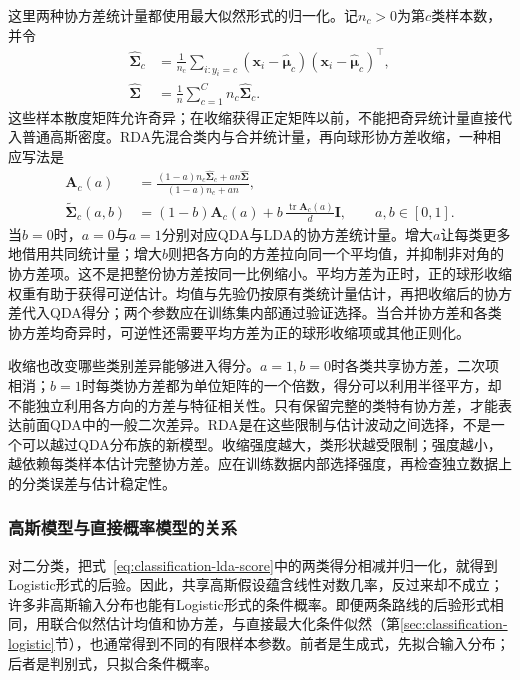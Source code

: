 这里两种协方差统计量都使用最大似然形式的归一化。记$n_c>0$为第$c$类样本数，并令
\[
  \begin{aligned}
    \hat{\bm{\Sigma}}_c
      &=\frac{1}{n_c}\sum_{i:y_i=c}
        (\bm{x}_i-\hat{\bm{\mu}}_c)
        (\bm{x}_i-\hat{\bm{\mu}}_c)^{\top},\\
    \hat{\bm{\Sigma}}
      &=\frac1n\sum_{c=1}^{C}n_c\hat{\bm{\Sigma}}_c.
  \end{aligned}
\]
这些样本散度矩阵允许奇异；在收缩获得正定矩阵以前，不能把奇异统计量直接代入普通高斯密度。RDA先混合类内与合并统计量，再向球形协方差收缩，一种相应写法是
\begin{equation}
  \begin{aligned}
    \bm{A}_c(a)
      &=\frac{(1-a)n_c\hat{\bm{\Sigma}}_c+an\hat{\bm{\Sigma}}}
              {(1-a)n_c+an},\\
    \tilde{\bm{\Sigma}}_c(a,b)
      &=(1-b)\bm{A}_c(a)
        +b\,\frac{\operatorname{tr}\bm{A}_c(a)}{d}\bm{I},
        \qquad a,b\in[0,1].
  \end{aligned}
  \label{eq:classification-rda}
\end{equation}
当$b=0$时，$a=0$与$a=1$分别对应QDA与LDA的协方差统计量。增大$a$让每类更多地借用共同统计量；增大$b$则把各方向的方差拉向同一个平均值，并抑制非对角的协方差项。这不是把整份协方差按同一比例缩小。平均方差为正时，正的球形收缩权重有助于获得可逆估计。均值与先验仍按原有类统计量估计，再把收缩后的协方差代入QDA得分；两个参数应在训练集内部通过验证选择。当合并协方差和各类协方差均奇异时，可逆性还需要平均方差为正的球形收缩项或其他正则化。

收缩也改变哪些类别差异能够进入得分。$a=1,b=0$时各类共享协方差，二次项相消；$b=1$时每类协方差都为单位矩阵的一个倍数，得分可以利用半径平方，却不能独立利用各方向的方差与特征相关性。只有保留完整的类特有协方差，才能表达前面QDA中的一般二次差异。RDA是在这些限制与估计波动之间选择，不是一个可以越过QDA分布族的新模型。收缩强度越大，类形状越受限制；强度越小，越依赖每类样本估计完整协方差。应在训练数据内部选择强度，再检查独立数据上的分类误差与估计稳定性。

\subsubsection{高斯模型与直接概率模型的关系}
\label{sec:classification-gda-direct-relation}

对二分类，把式~\eqref{eq:classification-lda-score}中的两类得分相减并归一化，就得到Logistic形式的后验。因此，共享高斯假设蕴含线性对数几率，反过来却不成立；许多非高斯输入分布也能有Logistic形式的条件概率。即便两条路线的后验形式相同，用联合似然估计均值和协方差，与直接最大化条件似然（第\ref{sec:classification-logistic}节），也通常得到不同的有限样本参数。前者是生成式，先拟合输入分布；后者是判别式，只拟合条件概率。

